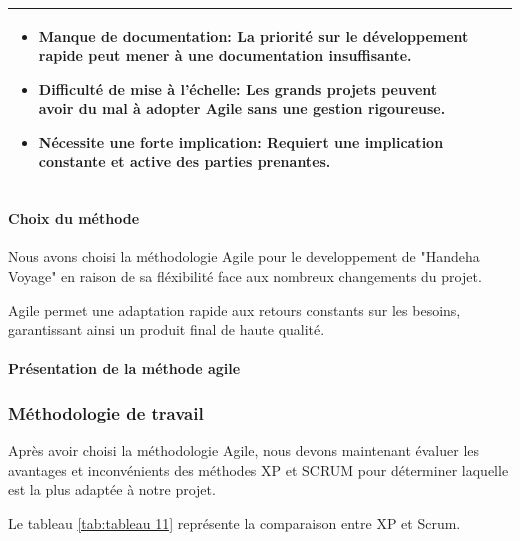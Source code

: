 \documentclass[12pt]{report}
\begin{document}
\begin{longtable}{|p{3cm}|p{5.5cm}|p{5.5cm}|}
\begin{itemize}
							\item \textbf{Manque de documentation:} La priorité sur le développement rapide peut mener à une documentation insuffisante.
							\item \textbf{Difficulté de mise à l'échelle:} Les grands projets peuvent avoir du mal à adopter Agile sans une gestion rigoureuse.
							\item \textbf{Nécessite une forte implication:} Requiert une implication constante et active des parties prenantes.
						\end{itemize}\\
						\hline 
				    \end{longtable}

				\paragraph{Choix du méthode}

				Nous avons choisi la méthodologie Agile pour le developpement de "Handeha Voyage" en raison de sa fléxibilité face aux nombreux changements du projet.
				
				Agile permet une adaptation rapide aux retours constants sur les besoins, garantissant ainsi un produit final de haute qualité.				

				\paragraph{Présentation de la méthode agile}

				\subsubsection{Méthodologie de travail}

				\hspace{15pt} Après avoir choisi la méthodologie Agile, nous devons maintenant évaluer les avantages et inconvénients des méthodes XP et SCRUM pour déterminer laquelle est la plus adaptée à notre projet.

				
				Le tableau \ref{tab:tableau 11} représente la comparaison entre XP et Scrum.
\end{document}
